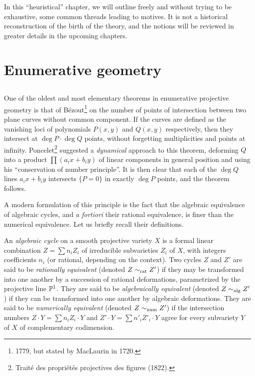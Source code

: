\documentclass[../main.tex]{subfiles}
\begin{document}
In this \enquote{heuristical} chapter, we will outline freely and without trying to be exhaustive, some common threads leading to motives.
It is not a historical reconstruction of the birth of the theory, and the notions will be reviewed in greater details in the upcoming chapters.

\section{Enumerative geometry}

\subsection{} One of the oldest and most elementary theorems in enumerative projective geometry is that of Bézout\footnote{1779, but stated by MacLaurin in 1720.} on the number of points of intersection between two plane curves without common component.
If the curves are defined as the vanishing loci of polynomials $P(x, y)$ and $Q(x, y)$ respectively, then they intersect at $\deg P \cdot \deg Q$ points, without forgetting multiplicities and points at infinity.
Poncelet\footnote{Traité des propriétés projectives des figures (1822).} suggested a \emph{dynamical} approach to this theorem, deforming $Q$ into a product $\prod (a_ix + b_iy)$ of linear components in general position and using his \enquote{conservation of number principle}.
It is then clear that each of the $\deg Q$ lines $a_ix + b_iy$ intersects $\{P = 0\}$ in exactly $\deg P$ points, and the theorem follows.

A modern formulation of this principle is the fact that the algebraic equivalence of algebraic cycles, and \emph{a fortiori} their rational equivalence, is finer than the numerical equivalence. Let us briefly recall their definitions.

An \emph{algebraic cycle} on a smooth projective variety $X$ is a formal linear combination $Z = \sum n_i Z_i$ of irreducible subvarieties $Z_i$ of $X$, with integers coefficients $n_i$ (or rational, depending on the context). Two cycles $Z$ and $Z'$ are said to be \emph{rationally equivalent} (denoted $Z \sim_{\rat} Z'$) if they may be transformed into one another by a succession of rational deformations, parametrized by the projective line $\P^1$. They are said to be \emph{algebraically equivalent} (denoted $Z \sim_{\alg} Z'$) if they can be transformed into one another by algebraic deformations. They are said to be \emph{numerically equivalent} (denoted $Z \sim_{\num} Z'$) if the intersection numbers $Z \cdot Y = \sum n_i Z_i \cdot Y$ and $Z' \cdot Y = \sum n'_i Z'_i \cdot Y$ agree for every subvariety $Y$ of $X$ of complementary codimension.
\end{document}
